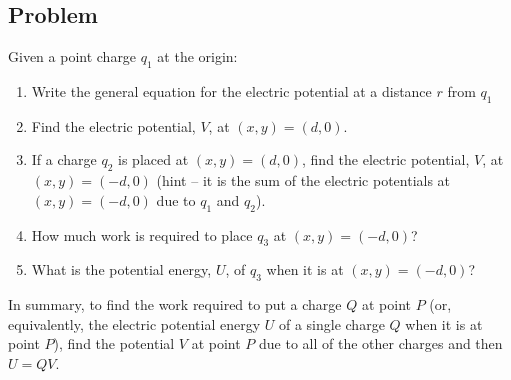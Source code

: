 \documentclass{article}
\begin{document}
\subsection{Problem}

Given a point charge $q_1$ at the origin:

\begin{enumerate}

  \item Write the general equation for the electric potential at a distance $r$ from $q_1$

        \ifsolutions
          
        \fi
        \ifsolutions\else
        
        \vskip 36.135pt
        \fi

  \item Find the electric potential, $V$, at $(x,y) = (d,0)$.

        \ifsolutions
          
        \fi
        \ifsolutions\else
        
        \vskip 36.135pt
        \fi

  \item If a charge $q_2$ is placed at $(x,y) = (d,0)$, find the electric potential, $V$, at $(x,y) = (-d,0)$ (hint -- it is the sum of the electric potentials at $(x,y)=(-d, 0)$ due to $q_1$ and $q_2$).

        \ifsolutions
          
        \fi
        \ifsolutions\else
        
        \vskip 36.135pt
        \fi

  \item How much work is required to place $q_3$ at $(x,y) = (-d,0)$?

        \ifsolutions
          
        \fi
        \ifsolutions\else
        
        \vskip 36.135pt
        \fi

  \item What is the potential energy, $U$, of $q_3$ when it is at $(x,y) = (-d,0)$?

        \ifsolutions
          
        \fi
        \ifsolutions\else
        
        \vskip 36.135pt
        \fi

\end{enumerate}

In summary, to find the work required to put a charge $Q$ at point $P$ (or, equivalently, the electric potential energy $U$ of a single charge $Q$ when it is at point $P$), find the potential $V$ at point $P$ due to all of the other charges and then $U = QV$.
\end{document}
